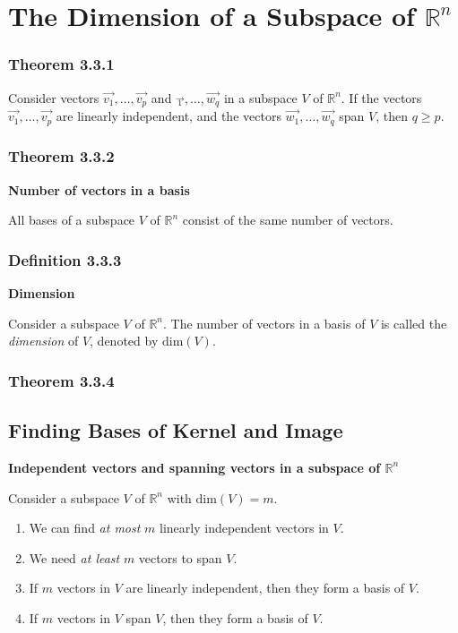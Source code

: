 \documentclass{report}
\begin{document}
\section{The Dimension of a Subspace of \texorpdfstring{$\mathbb{R}^{n}$}{R^n}}
\subsubsection*{Theorem 3.3.1}
\par\noindent Consider vectors $\vec{v_{1}},\ldots{},\vec{v_{p}}$ and $\vec{_{1}},\ldots{},\vec{w_{q}}$ in a subspace $V$ of $\mathbb{R}^{n}$. If the vectors $\vec{v_{1}},\ldots{},\vec{v_{p}}$ are linearly independent, and the vectors $\vec{w_{1}},\ldots{},\vec{w_{q}}$ span $V$, then $q\ge{}p$.
\subsubsection*{Theorem 3.3.2}
\par\noindent\textbf{Number of vectors in a basis}
\par\noindent All bases of a subspace $V$ of $\mathbb{R}^{n}$ consist of the same number of vectors.
\subsubsection*{Definition 3.3.3}
\par\noindent\textbf{Dimension}
\par\noindent Consider a subspace $V$ of $\mathbb{R}^{n}$. The number of vectors in a basis of $V$ is called the \textit{dimension} of $V$, denoted by $\textrm{dim}(V)$.
\subsubsection*{Theorem 3.3.4}
\subsection*{Finding Bases of Kernel and Image}
\par\noindent\textbf{Independent vectors and spanning vectors in a subspace of $\mathbb{R}^{n}$}
\par\noindent Consider a subspace $V$ of $\mathbb{R}^{n}$ with $\textrm{dim}(V)=m$.
\renewcommand{\labelenumi}{\textbf{\alph{enumi}.}}
\begin{enumerate}
\item We can find \textit{at most} $m$ linearly independent vectors in $V$.
\item We need \textit{at least} $m$ vectors to span $V$.
\item If $m$ vectors in $V$ are linearly independent, then they form a basis of $V$.
\item If $m$ vectors in $V$ span $V$, then they form a basis of $V$.
\end{enumerate}
\end{document}

